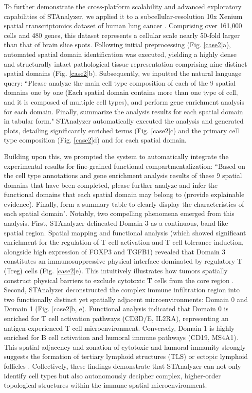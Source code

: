 \documentclass[a4,center,fleqn]{NAR}
\begin{document}
To further demonstrate the cross-platform scalability and advanced exploratory capabilities of STAnalyzer, we applied it to a subcellular-resolution 10x Xenium spatial transcriptomics dataset of human lung cancer \cite{janesick2023high,blampey2025novae}. Comprising over 161,000 cells and 480 genes, this dataset represents a cellular scale nearly 50-fold larger than that of brain slice spots. Following initial preprocessing (Fig. \ref{case2}a), automated spatial domain identification was executed, yielding a highly dense and structurally intact pathological tissue representation comprising nine distinct spatial domains (Fig. \ref{case2}b). Subsequently, we inputted the natural language query: ``Please analyze the main cell type composition of each of the 9 spatial domains one by one (Each spatial domain contains more than one type of cell, and it is composed of multiple cell types), and perform gene enrichment analysis for each domain. Finally, summarize the analysis results for each spatial domain in tabular form." STAnalyzer automatically executed the analysis and generated plots, detailing significantly enriched terms (Fig. \ref{case2}c) and the primary cell type composition (Fig. \ref{case2}d) and for each spatial domain.

Building upon this, we prompted the system to automatically integrate the experimental results for fine-grained functional compartmentalization: ``Based on the cell type annotations and gene enrichment analysis results of these 9 spatial domains that have been completed, please further analyze and infer the functional domains that each spatial domain may belong to (provide explainable evidence). Finally, form a summary table to clearly display the characteristics of each spatial domain". Notably, two compelling phenomena emerged from this analysis. First, STAnalyzer delineated Domain 3 as a continuous, band-like spatial region. Spatial mapping and functional analysis (which showed significant enrichment for the regulation of T cell activation and T cell tolerance induction, alongside high expression of FOXP3 and TGFB1) revealed that Domain 3 constitutes an immunosuppressive physical interface dominated by regulatory T (Treg) cells (Fig. \ref{case2}e). This intuitively illustrates how tumors spatially construct physical barriers to exclude cytotoxic T cells from the core region \cite{joyce2015t,schurch2020coordinated}. Second, STAnalyzer deconstructed the complex immune infiltration region into two functionally distinct yet spatially adjacent microenvironments: Domain 0 and Domain 1 (Fig. \ref{case2}b, e). Functional analysis indicated that Domain 0 is enriched for T cell activation pathways (CD3D/E, IL2RA), representing an antigen-experienced T cell microenvironment. Conversely, Domain 1 is highly enriched for B cell activation and humoral immune pathways (CD19, MS4A1). This spatial adjacency and zonation of cytotoxic and humoral immunity strongly suggests the formation of tertiary lymphoid structures (TLS) or ectopic lymphoid follicles \cite{sautes2019tertiary}. Collectively, these findings demonstrate that STAnalyzer can not only identify cell types but also autonomously decipher complex, higher-order topological structures within the immune spatial microenvironment.
\end{document}
